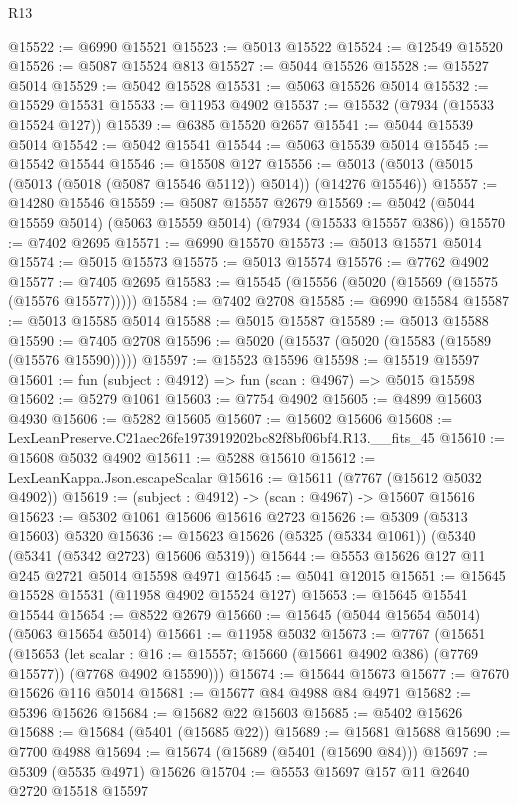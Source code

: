 \begin{lexlean}{R13}
\begin{coremodule}
@15522 := @6990 @15521
@15523 := @5013 @15522
@15524 := @12549 @15520
@15526 := @5087 @15524 @813
@15527 := @5044 @15526
@15528 := @15527 @5014
@15529 := @5042 @15528
@15531 := @5063 @15526 @5014
@15532 := @15529 @15531
@15533 := @11953 @4902
@15537 := @15532 (@7934 (@15533 @15524 @127))
@15539 := @6385 @15520 @2657
@15541 := @5044 @15539 @5014
@15542 := @5042 @15541
@15544 := @5063 @15539 @5014
@15545 := @15542 @15544
@15546 := @15508 @127
@15556 := @5013 (@5013 (@5015 (@5013 (@5018 (@5087 @15546 @5112)) @5014)) (@14276 @15546))
@15557 := @14280 @15546
@15559 := @5087 @15557 @2679
@15569 := @5042 (@5044 @15559 @5014) (@5063 @15559 @5014) (@7934 (@15533 @15557 @386))
@15570 := @7402 @2695
@15571 := @6990 @15570
@15573 := @5013 @15571 @5014
@15574 := @5015 @15573
@15575 := @5013 @15574
@15576 := @7762 @4902
@15577 := @7405 @2695
@15583 := @15545 (@15556 (@5020 (@15569 (@15575 (@15576 @15577)))))
@15584 := @7402 @2708
@15585 := @6990 @15584
@15587 := @5013 @15585 @5014
@15588 := @5015 @15587
@15589 := @5013 @15588
@15590 := @7405 @2708
@15596 := @5020 (@15537 (@5020 (@15583 (@15589 (@15576 @15590)))))
@15597 := @15523 @15596
@15598 := @15519 @15597
@15601 := fun (subject : @4912) => fun (scan : @4967) => @5015 @15598
@15602 := @5279 @1061
@15603 := @7754 @4902
@15605 := @4899 @15603 @4930
@15606 := @5282 @15605
@15607 := @15602 @15606
@15608 := LexLeanPreserve.C21aec26fe1973919202bc82f8bf06bf4.R13.__fits_45
@15610 := @15608 @5032 @4902
@15611 := @5288 @15610
@15612 := LexLeanKappa.Json.escapeScalar
@15616 := @15611 (@7767 (@15612 @5032 @4902))
@15619 := (subject : @4912) -> (scan : @4967) -> @15607 @15616
@15623 := @5302 @1061 @15606 @15616 @2723
@15626 := @5309 (@5313 @15603) @5320
@15636 := @15623 @15626 (@5325 (@5334 @1061)) (@5340 (@5341 (@5342 @2723) @15606 @5319))
@15644 := @5553 @15626 @127 @11 @245 @2721 @5014 @15598 @4971
@15645 := @5041 @12015
@15651 := @15645 @15528 @15531 (@11958 @4902 @15524 @127)
@15653 := @15645 @15541 @15544
@15654 := @8522 @2679
@15660 := @15645 (@5044 @15654 @5014) (@5063 @15654 @5014)
@15661 := @11958 @5032
@15673 := @7767
    (@15651
      (@15653
        (let scalar : @16 := @15557; @15660 (@15661 @4902 @386) (@7769 @15577))
        (@7768 @4902 @15590)))
@15674 := @15644 @15673
@15677 := @7670 @15626 @116 @5014
@15681 := @15677 @84 @4988 @84 @4971
@15682 := @5396 @15626
@15684 := @15682 @22 @15603
@15685 := @5402 @15626
@15688 := @15684 (@5401 (@15685 @22))
@15689 := @15681 @15688
@15690 := @7700 @4988
@15694 := @15674 (@15689 (@5401 (@15690 @84)))
@15697 := @5309 (@5535 @4971) @15626
@15704 := @5553 @15697 @157 @11 @2640 @2720 @15518 @15597

\end{coremodule}
\end{lexlean}
